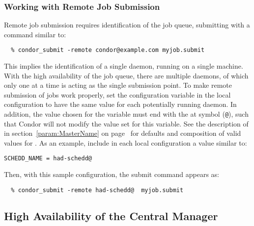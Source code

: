 \subsubsection{\label{sec:HA-remote-submit} Working with Remote Job Submission}

Remote job submission requires identification of the job queue,
submitting with a command similar to:
\footnotesize
\begin{verbatim}
  % condor_submit -remote condor@example.com myjob.submit
\end{verbatim}
\normalsize
This implies the identification of a single  daemon,
running on a single machine.
With the high availability of the job queue, there are
multiple  daemons, of which only one at a time is acting
as the single submission point.
To make remote submission of jobs work properly,
set the configuration variable  in the local
configuration to have
the same value for each potentially running  daemon.
In addition, the value chosen for the variable 
must end with the at symbol (\verb$@$),
such that Condor will not modify the value set for this variable.
See the description of  in
section~\ref{param:MasterName} on page~\pageref{param:MasterName}
for defaults and composition of valid values for .
As an example, include in each local configuration a value similar to:
\footnotesize
\begin{verbatim}
SCHEDD_NAME = had-schedd@
\end{verbatim}
\normalsize


Then, with this sample configuration, the
submit command appears as:
\footnotesize
\begin{verbatim}
  % condor_submit -remote had-schedd@  myjob.submit
\end{verbatim}
\normalsize

\subsection{\label{sec:HA-negotiator} High Availability of the
Central Manager} 

